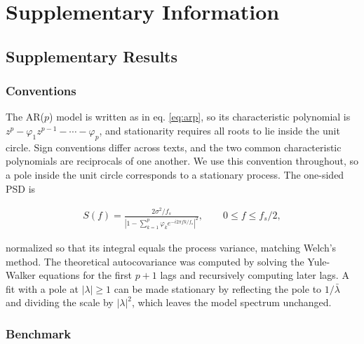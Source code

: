 \documentclass[pdflatex,sn-mathphys-num]{sn-jnl}
\begin{document}
\backmatter

\clearpage
\section*{Supplementary Information}\label{sec:supp}

\setcounter{figure}{0}
\renewcommand{\thefigure}{S\arabic{figure}}
\setcounter{table}{0}
\renewcommand{\thetable}{S\arabic{table}}
\setcounter{equation}{0}
\renewcommand{\theequation}{S\arabic{equation}}

\subsection*{Supplementary Results}\label{sec:sresults}

\subsubsection*{Conventions}

The AR($p$) model is written as in eq. \ref{eq:arp}, so its characteristic polynomial is $z^p - \varphi_1 z^{p-1} - \cdots - \varphi_p$, and stationarity requires all roots to lie inside the unit circle. Sign conventions differ across texts, and the two common characteristic polynomials are reciprocals of one another. We use this convention throughout, so a pole inside the unit circle corresponds to a stationary process. The one-sided PSD is

\begin{align}
S(f) = \frac{2\sigma^2/f_s}{\left|1 - \sum_{k=1}^{p}\varphi_k e^{-i 2\pi f k/f_s}\right|^{2}}, \qquad 0 \le f \le f_s/2,
\end{align}

normalized so that its integral equals the process variance, matching Welch's method. The theoretical autocovariance was computed by solving the Yule-Walker equations for the first $p+1$ lags and recursively computing later lags. A fit with a pole at $|\lambda| \ge 1$ can be made stationary by reflecting the pole to $1/\bar\lambda$ and dividing the scale by $|\lambda|^2$, which leaves the model spectrum unchanged.

\subsubsection*{Benchmark}
\end{document}
